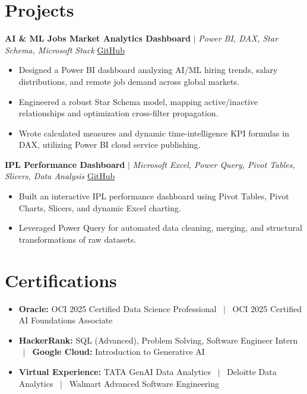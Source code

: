 \documentclass[a4paper,9pt]{article}
\newcommand{\resumeItem}[1]{\item\small #1}
\begin{document}
\vspace{-2mm}

\section{Projects}

\noindent\textbf{AI \& ML Jobs Market Analytics Dashboard} $|$ \textit{Power BI, DAX, Star Schema, Microsoft Stack} \hfill
\href{https://github.com/hsachan295-source/Power-BI-Portfolio}{\small GitHub}
\begin{itemize}
\resumeItem{Designed a Power BI dashboard analyzing AI/ML hiring trends, salary distributions, and remote job demand across global markets.}
\resumeItem{Engineered a robust Star Schema model, mapping active/inactive relationships and optimization cross-filter propagation.}
\resumeItem{Wrote calculated measures and dynamic time-intelligence KPI formulas in DAX, utilizing Power BI cloud service publishing.}
\end{itemize}

\vspace{1.5pt}
\noindent\textbf{IPL Performance Dashboard} $|$ \textit{Microsoft Excel, Power Query, Pivot Tables, Slicers, Data Analysis} \hfill
\href{https://github.com/hsachan295-source/Power-BI-Portfolio}{\small GitHub}
\begin{itemize}
\resumeItem{Built an interactive IPL performance dashboard using Pivot Tables, Pivot Charts, Slicers, and dynamic Excel charting.}
\resumeItem{Leveraged Power Query for automated data cleaning, merging, and structural transformations of raw datasets.}
\end{itemize}


\vspace{-2mm}

\section{Certifications}
\begin{itemize}
\resumeItem{\textbf{Oracle:} OCI 2025 Certified Data Science Professional ~$|$~ OCI 2025 Certified AI Foundations Associate}
\resumeItem{\textbf{HackerRank:} SQL (Advanced), Problem Solving, Software Engineer Intern ~$|$~ \textbf{Google Cloud:} Introduction to Generative AI}
\resumeItem{\textbf{Virtual Experience:} TATA GenAI Data Analytics ~$|$~ Deloitte Data Analytics ~$|$~ Walmart Advanced Software Engineering}
\end{itemize}

\vspace{-2mm}
\end{document}
